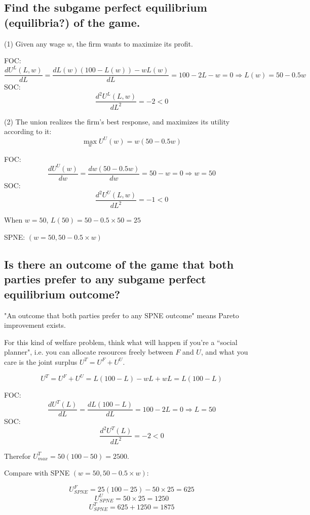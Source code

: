 \documentclass{article}
\begin{document}
\subsection{Find the subgame perfect equilibrium (equilibria?) of the game.}

(1) Given any wage $w$, the firm wants to maximize its profit. 

FOC:
$$\frac{d U^L(L,w)}{d L} = \frac{d L(w)(100-L(w)) - wL(w)}{d L} = 100-2L-w =0 \Rightarrow L(w) = 50-0.5w$$
SOC: 
$$\frac{d^2 U^L(L,w)}{d L^2} = -2<0$$

(2) The union realizes the firm's best response, and maximizes its utility according to it:
$$\max_{w} U^U(w) = w (50-0.5w)$$

FOC:
$$\frac{d U^U(w)}{d w} = \frac{d w (50-0.5w)}{d w} = 50-w =0 \Rightarrow w = 50$$
SOC: 
$$\frac{d^2 U^U(L,w)}{d L^2} = -1<0$$

When $w=50$, $L(50)=50-0.5\times50 =25$


SPNE: $(w= 50,50-0.5\times w)$

%
\subsection{Is there an outcome of the game that both parties prefer to any subgame perfect
equilibrium outcome? }

\begin{mdframed}[backgroundcolor=blue!20,linecolor=white]
"An outcome that both parties prefer to any SPNE outcome" means Pareto improvement exists.

\medskip

For this kind of welfare problem, think what will happen if you're a ``social planner", i.e. you can allocate resources freely between $F$ and $U$, and what you care is the joint surplus $U^T=U^F+U^U$.

\end{mdframed}

$$U^T=U^F+U^U = L(100-L) - wL +wL =L(100-L)$$

FOC:
$$\frac{d U^T(L)}{d L} = \frac{d L(100-L)}{d L} = 100-2L =0 \Rightarrow L = 50$$
SOC: 
$$\frac{d^2 U^T(L)}{d L^2} = -2<0$$

Therefor $U^T_{max} = 50 (100-50) =2500$.

\medskip

Compare with SPNE $(w= 50,50-0.5\times w)$:

$$U^F_{SPNE} = 25(100-25)-50\times 25 = 625$$
$$U^U_{SPNE} = 50 \times 25 = 1250$$
$$U^T_{SPNE} = 625 + 1250 = 1875$$
\end{document}

